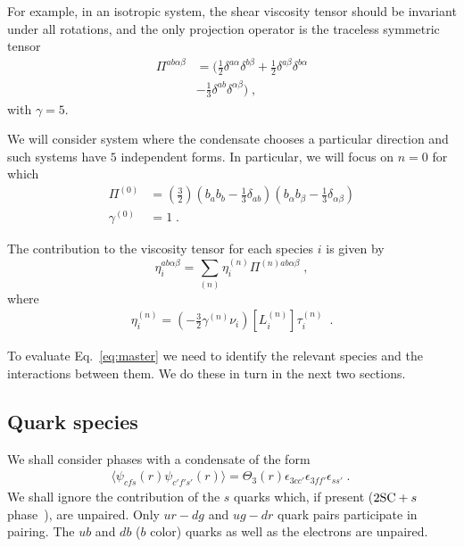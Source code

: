 \documentclass[10pt, aps, prd, superscriptaddress, nofootinbib, 
               amsmath, amssymb, twocolumn,
               preprintnumbers, showpacs,
               raggedbottom,
               floatfix]{revtex4-1}
\newcommand{\SC}{{\rm{SC}}}
\begin{document}
For example, in an isotropic system, the shear viscosity tensor should be
invariant under all rotations, and the only projection operator is the
traceless symmetric tensor
\begin{equation}
\begin{split}
\Pi^{ab\alpha\beta} &= ( \frac{1}{2}\delta^{a\alpha}\delta^{b\beta} 
    + \frac{1}{2}\delta^{a\beta}\delta^{b\alpha}\\
    &- \frac{1}{3}\delta^{ab}\delta^{\alpha\beta})\;,
\end{split}
\end{equation}
with $\gamma=5$.

We will consider system where the condensate chooses a particular direction and
such systems have $5$ independent forms.  In particular, we will focus on $n=0$
for which
\begin{equation}
\begin{split}
\Pi^{(0)} &=(\frac{3}{2})(b_ab_b-\frac{1}{3}\delta_{ab})
(b_\alpha b_\beta-\frac{1}{3}\delta_{\alpha\beta})\\
\gamma^{(0)} &= 1\;.
\end{split}
\end{equation}

The contribution to the viscosity tensor for each species $i$ is given by
\begin{equation}
\eta_i^{ab\alpha\beta} = \sum_{(n)} \eta_i^{(n)} \Pi^{(n)ab\alpha\beta}\;,
\end{equation}
where
\begin{equation}
\begin{split}
\eta_i^{(n)} =
(-\frac{3}{2}\gamma^{(n)}\nu_i)[L_i^{(n)}]\tau_i^{(n)}~\label{eq:eta_ioftau_i}\;.
\end{split}
\end{equation}

To evaluate Eq.~\ref{eq:master} we need to identify the relevant species and
the interactions between them. We do these in turn in the next two sections.

\subsection{Quark species}
\label{sec:quarks}
We shall consider phases with a condensate of the form
\begin{equation}
\begin{split}
\langle\psi_{cfs}(r)\psi_{c'f's'}(r)\rangle = \Theta_3(r) 
\epsilon_{3cc'}\epsilon_{3ff'}\epsilon_{ss'}\;.~\label{eq:2SCLOFFcondensate2}
\end{split}
\end{equation}
We shall ignore the contribution of the $s$ quarks which, if present ($2\SC+s$
phase~\cite{Shovkovy:2003uu}), are unpaired. Only $ur-dg$ and $ug-dr$ quark pairs participate
in pairing. The $ub$ and $db$ ($b$ color) quarks as well as the electrons are
unpaired.  
\end{document}
